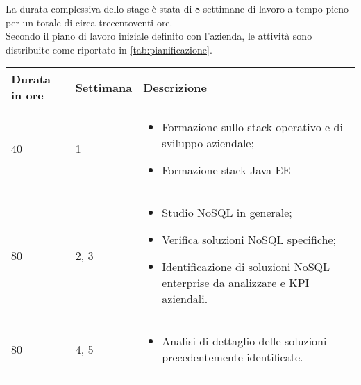 La durata complessiva dello stage è stata di 8 settimane di lavoro a tempo pieno per un totale di circa trecentoventi ore.\\
\noindent Secondo il piano di lavoro iniziale definito con l'azienda, le attività sono distribuite come riportato in \autoref{tab:pianificazione}.\\


\begin{center}

        \renewcommand{\arraystretch}{1.5}
    
        \centering
        \begin{longtable}{| C{2.5cm} | C{2cm} | L{7.2cm} | }
            
            \hline
            
            \textbf{Durata in ore} & \textbf{Settimana} & \textbf{Descrizione} \\
            
            \hline
            
            40 & 1 &
            \begin{itemize}[leftmargin=*]
                \item Formazione sullo stack operativo e di sviluppo aziendale;
                \item Formazione stack Java EE
            \end{itemize} \\
            
            \hline
            
            80 & 2, 3 &
            \begin{itemize}[leftmargin=*]
                \item Studio NoSQL in generale;
                \item Verifica soluzioni NoSQL specifiche;
                \item Identificazione di soluzioni NoSQL enterprise da analizzare e KPI aziendali. 
            \end{itemize}  \\
            
            \hline
        
            
            80 & 4, 5 &
            \begin{itemize}[leftmargin=*]
                \item Analisi di dettaglio delle soluzioni precedentemente identificate. 
            \end{itemize}  \\
             

\end{longtable}
\end{center}
